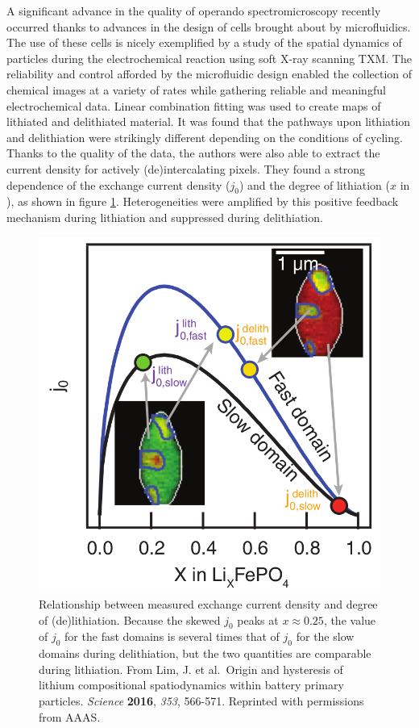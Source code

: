 \documentclass[journal=cmatex,manuscript=perspective]{achemso}
\begin{document}
A significant advance in the quality of operando spectromicroscopy
recently occurred thanks to advances in the design of cells brought
about by microfluidics. The use of these cells is nicely exemplified
by a study of the spatial dynamics of  particles during
the electrochemical reaction using soft X-ray scanning
TXM\cite{lim2016}. The reliability and control afforded by the
microfluidic design enabled the collection of chemical images at a
variety of rates while gathering reliable and meaningful
electrochemical data. Linear combination fitting was used to create
maps of lithiated and delithiated material. It was found that the
pathways upon lithiation and delithiation were strikingly different
depending on the conditions of cycling. Thanks to the quality of the
data, the authors were also able to extract the current density for
actively (de)intercalating pixels. They found a strong dependence of
the exchange current density ($j_0$) and the degree of lithiation ($x$
in ), as shown in figure
\ref{figure:lim2016}. Heterogeneities were amplified by this positive
feedback mechanism during lithiation and suppressed during
delithiation.

\begin{figure}
  \includegraphics[width=\textwidth]{lim2016.png}
  \caption{Relationship between measured exchange current density and
    degree of (de)lithiation. Because the skewed $j_0$ peaks at $x
    \approx 0.25$, the value of $j_0$ for the fast domains is several
    times that of $j_0$ for the slow domains during delithiation, but
    the two quantities are comparable during lithiation. From Lim,
    J. et al.\ Origin and hysteresis of lithium compositional
    spatiodynamics within battery primary particles. \textit{Science}
    \textbf{2016}, \textit{353}, 566-571. Reprinted with permissions
    from AAAS.}
  \label{figure:lim2016}
\end{figure}
\end{document}
